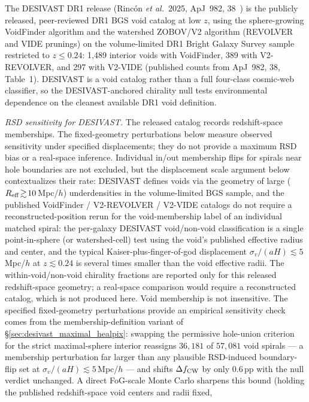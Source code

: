 \documentclass[aps,prd,twocolumn,superscriptaddress,showpacs,preprintnumbers,nofootinbib,longbibliography,floatfix]{revtex4-2}
\begin{document}
The DESIVAST DR1 release (Rinc\'on \textit{et al.}\ 2025, ApJ~982,
38~\cite{DESIVAST2025}) is the publicly released, peer-reviewed
DR1 BGS void catalog at low $z$, using the sphere-growing VoidFinder
algorithm and the watershed ZOBOV/V2 algorithm (REVOLVER and VIDE
prunings) on the volume-limited DR1 Bright Galaxy Survey sample
restricted to $z \leq 0.24$: 1,489 interior voids with VoidFinder,
389 with V2-REVOLVER, and 297 with V2-VIDE (published counts
from ApJ~982, 38, Table~1). DESIVAST is a void
catalog rather than a full four-class cosmic-web classifier, so the
DESIVAST-anchored chirality null tests environmental dependence on
the cleanest available DR1 void definition.

\emph{RSD sensitivity for DESIVAST.} The released catalog records
redshift-space memberships. The fixed-geometry perturbations below
measure observed sensitivity under specified displacements; they do
not provide a maximum RSD bias or a real-space inference. Individual
in/out membership flips for
spirals near hole boundaries are not excluded, but the displacement
scale argument below contextualizes their rate: DESIVAST defines voids via the geometry of large
($R_{\rm eff}\!\gtrsim\!10$\,Mpc/$h$) underdensities in the
volume-limited BGS sample, and the published VoidFinder /
V2-REVOLVER / V2-VIDE catalogs do not require a
reconstructed-position rerun for the void-membership label of an
individual matched spiral: the per-galaxy DESIVAST void/non-void
classification is a single point-in-sphere (or watershed-cell)
test using the void's published effective radius and center, and
the typical Kaiser-plus-finger-of-god displacement $\sigma_v/(aH)
\lesssim 5$\,Mpc/$h$ at $z \lesssim 0.24$ is several times smaller
than the void effective radii. The within-void/non-void chirality
fractions are reported only for this released redshift-space geometry;
a real-space comparison would require a reconstructed catalog, which is
not produced here. Void membership is not insensitive. The specified
fixed-geometry perturbations provide an empirical sensitivity check
comes from the membership-definition variant of
\S\ref{sec:desivast_maximal_healpix}: swapping the permissive
hole-union criterion for the strict maximal-sphere interior reassigns
$36{,}181$ of $57{,}081$ void spirals --- a membership perturbation
far larger than any plausible RSD-induced boundary-flip set at
$\sigma_v/(aH) \lesssim 5$\,Mpc/$h$ --- and shifts
$\Delta f_{\rm CW}$ by only $0.6$\,pp with the null verdict
unchanged. A direct FoG-scale Monte Carlo sharpens this bound
(holding the published redshift-space void centers and radii fixed,
\end{document}
